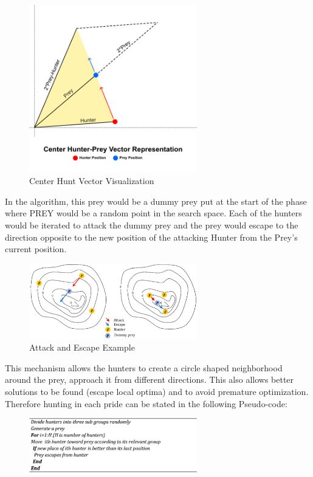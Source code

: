 \begin{figure}[h]
\begin{center}
\includegraphics[width=0.65\textwidth]{img/pa/center-hunt}
\caption{Center Hunt Vector Visualization}
\end{center}
\end{figure}

In the algorithm, this prey would be a dummy prey put at the start of the phase where PREY would be a random point in the search space. Each of the hunters would be iterated to attack the dummy prey and the prey would escape to the direction opposite to the new position of the attacking Hunter from the Prey's current position.
\begin{figure}[h]
\begin{center}
\includegraphics[width=0.65\textwidth]{img/pa/hunting_attack}
\caption{Attack and Escape Example}
\end{center}
\end{figure}
This mechanism allows the hunters to create a circle shaped neighborhood around the prey, approach it from different directions. This also allows better solutions to be found (escape local optima) and to avoid premature optimization.
Therefore hunting in each pride can be stated in the following Pseudo-code:
\begin{figure}[h]
\begin{center}
\includegraphics[width=0.65\textwidth]{img/pa/hunting_pseudo}
\end{center}
\end{figure}

